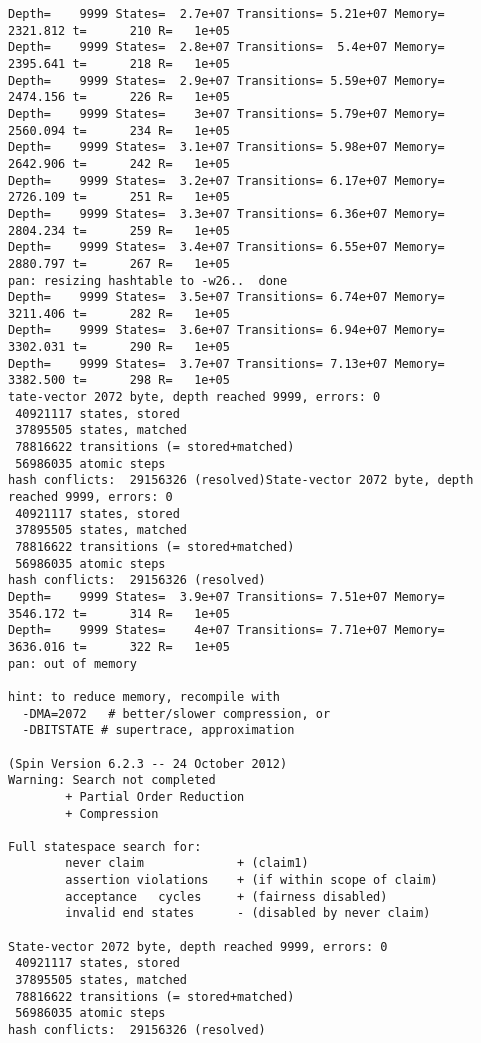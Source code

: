 \documentclass{llncs}
\begin{document}
\begin{lstlisting}
Depth=    9999 States=  2.7e+07 Transitions= 5.21e+07 Memory=  2321.812 t=      210 R=   1e+05
Depth=    9999 States=  2.8e+07 Transitions=  5.4e+07 Memory=  2395.641 t=      218 R=   1e+05
Depth=    9999 States=  2.9e+07 Transitions= 5.59e+07 Memory=  2474.156 t=      226 R=   1e+05
Depth=    9999 States=    3e+07 Transitions= 5.79e+07 Memory=  2560.094 t=      234 R=   1e+05
Depth=    9999 States=  3.1e+07 Transitions= 5.98e+07 Memory=  2642.906 t=      242 R=   1e+05
Depth=    9999 States=  3.2e+07 Transitions= 6.17e+07 Memory=  2726.109 t=      251 R=   1e+05
Depth=    9999 States=  3.3e+07 Transitions= 6.36e+07 Memory=  2804.234 t=      259 R=   1e+05
Depth=    9999 States=  3.4e+07 Transitions= 6.55e+07 Memory=  2880.797 t=      267 R=   1e+05
pan: resizing hashtable to -w26..  done
Depth=    9999 States=  3.5e+07 Transitions= 6.74e+07 Memory=  3211.406 t=      282 R=   1e+05
Depth=    9999 States=  3.6e+07 Transitions= 6.94e+07 Memory=  3302.031 t=      290 R=   1e+05
Depth=    9999 States=  3.7e+07 Transitions= 7.13e+07 Memory=  3382.500 t=      298 R=   1e+05
tate-vector 2072 byte, depth reached 9999, errors: 0
 40921117 states, stored
 37895505 states, matched
 78816622 transitions (= stored+matched)
 56986035 atomic steps
hash conflicts:  29156326 (resolved)State-vector 2072 byte, depth reached 9999, errors: 0
 40921117 states, stored
 37895505 states, matched
 78816622 transitions (= stored+matched)
 56986035 atomic steps
hash conflicts:  29156326 (resolved)
Depth=    9999 States=  3.9e+07 Transitions= 7.51e+07 Memory=  3546.172 t=      314 R=   1e+05
Depth=    9999 States=    4e+07 Transitions= 7.71e+07 Memory=  3636.016 t=      322 R=   1e+05
pan: out of memory

hint: to reduce memory, recompile with
  -DMA=2072   # better/slower compression, or
  -DBITSTATE # supertrace, approximation

(Spin Version 6.2.3 -- 24 October 2012)
Warning: Search not completed
        + Partial Order Reduction
        + Compression

Full statespace search for:
        never claim             + (claim1)
        assertion violations    + (if within scope of claim)
        acceptance   cycles     + (fairness disabled)
        invalid end states      - (disabled by never claim)

State-vector 2072 byte, depth reached 9999, errors: 0
 40921117 states, stored
 37895505 states, matched
 78816622 transitions (= stored+matched)
 56986035 atomic steps
hash conflicts:  29156326 (resolved)


\end{lstlisting}
\end{document}
